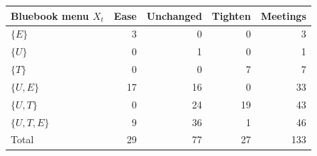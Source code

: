 \begin{tabular}{lrrrr}
\toprule
Bluebook menu $X_t$ & Ease & Unchanged & Tighten & Meetings \\
\midrule
$\{E\}$ & 3 & 0 & 0 & 3 \\
$\{U\}$ & 0 & 1 & 0 & 1 \\
$\{T\}$ & 0 & 0 & 7 & 7 \\
$\{U,E\}$ & 17 & 16 & 0 & 33 \\
$\{U,T\}$ & 0 & 24 & 19 & 43 \\
$\{U,T,E\}$ & 9 & 36 & 1 & 46 \\
\midrule
Total & 29 & 77 & 27 & 133 \\
\bottomrule
\end{tabular}